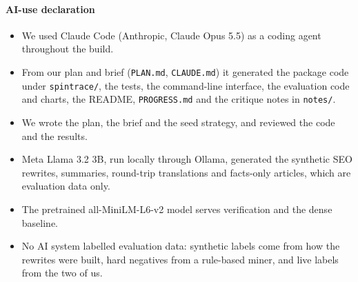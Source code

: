 \documentclass[11pt,a4paper]{article}
\newcommand{\code}[1]{\texttt{#1}}
\begin{document}
\paragraph{AI-use declaration}
\begin{itemize}[itemsep=0.25em]
  \item We used Claude Code (Anthropic, Claude Opus 5.5) as a coding agent throughout the build.
  \item From our plan and brief (\code{PLAN.md}, \code{CLAUDE.md}) it generated the package code under \code{spintrace/}, the tests, the command-line interface, the evaluation code and charts, the README, \code{PROGRESS.md} and the critique notes in \code{notes/}.
  \item We wrote the plan, the brief and the seed strategy, and reviewed the code and the results.
  \item Meta Llama 3.2 3B, run locally through Ollama, generated the synthetic SEO rewrites, summaries, round-trip translations and facts-only articles, which are evaluation data only.
  \item The pretrained all-MiniLM-L6-v2 model serves verification and the dense baseline.
  \item No AI system labelled evaluation data: synthetic labels come from how the rewrites were built, hard negatives from a rule-based miner, and live labels from the two of us.
\end{itemize}
\end{document}
